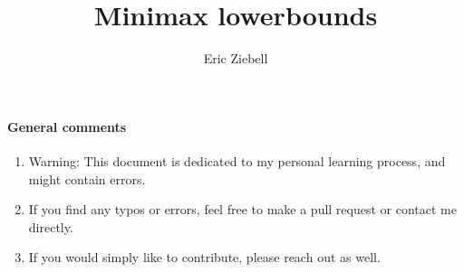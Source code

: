 \documentclass[a4paper]{article}
\author{Eric Ziebell}
\title{Minimax lowerbounds}
\begin{document}
\maketitle

\paragraph{General comments}
\begin{enumerate}
\item Warning: This document is dedicated to my personal learning process, and might contain errors.
\item If you find any typos or errors, feel free to make a pull request or contact me directly. 
\item If you would simply like to contribute, please reach out as well. 
\end{enumerate}
\end{document}
